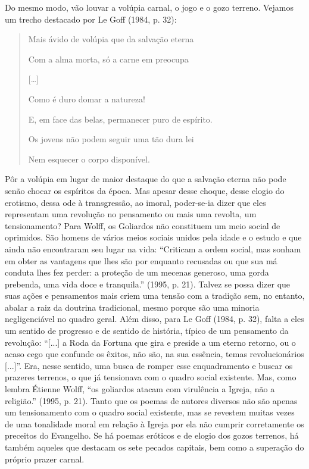 Do mesmo modo, vão louvar a volúpia carnal, o jogo e o gozo terreno.
Vejamos um trecho destacado por Le Goff (1984, p. 32):

\begin{quote}
Mais ávido de volúpia que da salvação eterna

Com a alma morta, só a carne em preocupa

{[}\ldots{}{]}

Como é duro domar a natureza!

E, em face das belas, permanecer puro de espírito.

Os jovens não podem seguir uma tão dura lei

Nem esquecer o corpo disponível.
\end{quote}

Pôr a volúpia em lugar de maior destaque do que a salvação eterna não
pode senão chocar os espíritos da época. Mas apesar desse choque, desse
elogio do erotismo, dessa ode à transgressão, ao imoral, poder-se-ia
dizer que eles representam uma revolução no pensamento ou mais uma
revolta, um tensionamento? Para Wolff, os Goliardos não constituem um
meio social de oprimidos. São homens de vários meios sociais unidos pela
idade e o estudo e que ainda não encontraram seu lugar na vida:
``Criticam a ordem social, mas sonham em obter as vantagens que lhes são
por enquanto recusadas ou que sua má conduta lhes fez perder: a proteção
de um mecenas generoso, uma gorda prebenda, uma vida doce e tranquila.''
(1995, p. 21). Talvez se possa dizer que suas ações e pensamentos mais
criem uma tensão com a tradição sem, no entanto, abalar a raiz da
doutrina tradicional, mesmo porque são uma minoria negligenciável no
quadro geral. Além disso, para Le Goff (1984, p. 32), falta a eles um
sentido de progresso e de sentido de história, típico de um pensamento
da revolução: ``{[}...{]} a Roda da Fortuna que gira e preside a um
eterno retorno, ou o acaso cego que confunde os êxitos, não são, na sua
essência, temas revolucionários {[}...{]}''. Era, nesse sentido, uma
busca de romper esse enquadramento e buscar os prazeres terrenos, o que
já tensionava com o quadro social existente. Mas, como lembra Étienne
Wolff, ``os goliardos atacam com virulência a Igreja, não a religião.''
(1995, p. 21). Tanto que os poemas de autores diversos não são apenas um
tensionamento com o quadro social existente, mas se revestem muitas
vezes de uma tonalidade moral em relação à Igreja por ela não cumprir
corretamente os preceitos do Evangelho. Se há poemas eróticos e de
elogio dos gozos terrenos, há também aqueles que destacam os sete
pecados capitais, bem como a superação do próprio prazer carnal.

